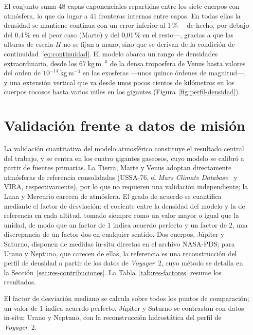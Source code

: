 El conjunto suma 48 capas exponenciales repartidas entre los siete cuerpos con atmósfera, lo que da lugar a 41 fronteras internas entre capas. En todas ellas la densidad se mantiene continua con un error inferior al 1\,\% ---de hecho, por debajo del 0{,}4\,\% en el peor caso (Marte) y del 0{,}01\,\% en el resto---, gracias a que las alturas de escala $H$ no se fijan a mano, sino que se derivan de la condición de continuidad~\eqref{eq:continuidad}. El modelo abarca un rango de densidades extraordinario, desde los $67~\mathrm{kg\,m^{-3}}$ de la densa troposfera de Venus hasta valores del orden de $10^{-14}~\mathrm{kg\,m^{-3}}$ en las exosferas ---unos quince órdenes de magnitud---, y una extensión vertical que va desde unos pocos cientos de kilómetros en los cuerpos rocosos hasta varios miles en los gigantes (Figura~\ref{fig:perfil-densidad}).

\section{Validación frente a datos de misión}
\label{sec:res-validacion}

La validación cuantitativa del modelo atmosférico constituye el resultado central del trabajo, y se centra en los cuatro gigantes gaseosos, cuyo modelo se calibró a partir de fuentes primarias. La Tierra, Marte y Venus adoptan directamente atmósferas de referencia consolidadas (\gls{USSA}-76, el \textit{Mars Climate Database}~\cite{mcd} y \gls{VIRA}, respectivamente), por lo que no requieren una validación independiente; la Luna y Mercurio carecen de atmósfera. El grado de acuerdo se cuantifica mediante el factor de desviación: el cociente entre la densidad del modelo y la de referencia en cada altitud, tomado siempre como un valor mayor o igual que la unidad, de modo que un factor de 1 indica acuerdo perfecto y un factor de 2, una discrepancia de un factor dos en cualquier sentido. Dos cuerpos, Júpiter y Saturno, disponen de medidas in-situ directas en el archivo \gls{NASA}-\gls{PDS}; para Urano y Neptuno, que carecen de ellas, la referencia es una reconstrucción del perfil de densidad a partir de los datos de \textit{Voyager}~2, cuyo método se detalla en la Sección~\ref{sec:res-contribuciones}. La Tabla~\ref{tab:res-factores} resume los resultados.

 El factor de desviación mediano se calcula sobre todos los puntos de comparación; un valor de 1 indica acuerdo perfecto. Júpiter y Saturno se contrastan con datos in-situ; Urano y Neptuno, con la reconstrucción hidrostática del perfil de \textit{Voyager}~2.

